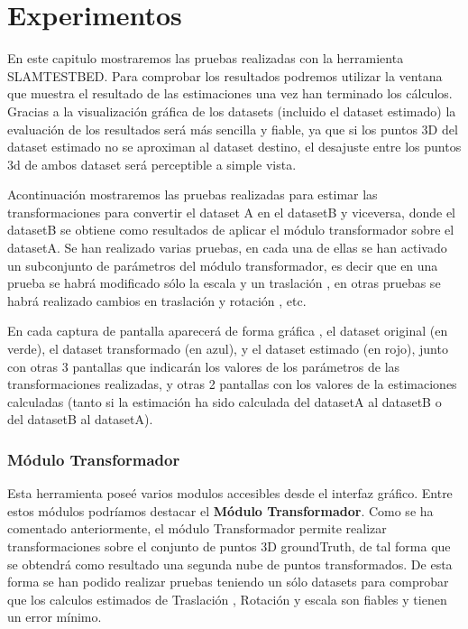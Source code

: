 \chapter{Experimentos} \label{cap:experimentos}
\setcounter{section}{5}
En este capitulo mostraremos las pruebas realizadas con la herramienta SLAMTESTBED.
Para comprobar los resultados podremos utilizar la ventana que muestra el resultado de las estimaciones una vez han terminado los cálculos. Gracias a la visualización gráfica de los datasets (incluido el dataset estimado) la evaluación de los resultados será más sencilla y fiable, ya que si los puntos 3D del dataset estimado no se aproximan al dataset destino, el desajuste entre los puntos 3d de ambos dataset será perceptible a simple vista.


Acontinuación mostraremos las pruebas realizadas para estimar las transformaciones para convertir el dataset A en el datasetB y viceversa, donde el datasetB se obtiene como resultados de aplicar el módulo transformador sobre el datasetA.
Se han realizado varias pruebas, en cada una de ellas se han activado un subconjunto de parámetros del módulo transformador, es decir que en una prueba se habrá modificado sólo la escala y un traslación , en otras pruebas se habrá realizado cambios en traslación y rotación , etc.

En cada captura de pantalla aparecerá de forma gráfica , el dataset original (en verde), el dataset transformado (en azul), y el dataset estimado (en rojo), junto con otras 3 pantallas que indicarán los valores de los parámetros de las transformaciones realizadas, y otras 2 pantallas con los valores de la estimaciones calculadas (tanto si la estimación ha sido calculada del datasetA al datasetB o del datasetB al datasetA).

\subsection{Módulo Transformador}
Esta herramienta poseé varios modulos accesibles desde el interfaz gráfico. Entre estos módulos podríamos destacar el \textbf{Módulo Transformador}.
Como se ha comentado anteriormente, el módulo Transformador permite realizar transformaciones sobre el conjunto de puntos 3D groundTruth, de tal forma que se obtendrá como resultado una segunda nube de puntos transformados. De esta forma se han podido realizar pruebas teniendo un sólo datasets para comprobar que los calculos estimados de Traslación , Rotación y escala son fiables y tienen un error mínimo.

